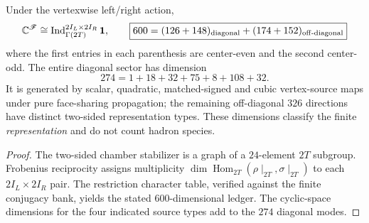 \documentclass[11pt]{article}
\begin{document}
\begin{theorem}
\label{p1:thm:v366-600-chamber-representation-ledger}
Under the vertexwise left/right action,
\[
 \mathbb C^{\mathscr F}\cong
 \operatorname{Ind}_{\Gamma(2T)}^{2I_L\times2I_R}{\bf1},
\qquad
 \boxed{600=(126+148)_{\rm diagonal}+(174+152)_{\rm off\text{-}diagonal}}
\]
where the first entries in each parenthesis are center-even and the
second center-odd.  The entire diagonal sector has dimension
\[
 \boxed{274=1+18+32+75+8+108+32}.
\]
It is generated by scalar, quadratic, matched-signed and cubic
vertex-source maps under pure face-sharing propagation; the
remaining off-diagonal $326$ directions have distinct two-sided
representation types.  These dimensions classify the finite
\emph{representation} and do not count hadron species.
\end{theorem}
\begin{proof}
The two-sided chamber stabilizer is a graph of a $24$-element
$2T$ subgroup.  Frobenius reciprocity assigns multiplicity
$\dim\operatorname{Hom}_{2T}(\rho\!\mid_{2T},\sigma\!\mid_{2T})$
to each $2I_L\times2I_R$ pair.  The restriction character table,
verified against the finite conjugacy bank, yields the stated
$600$-dimensional ledger.  The cyclic-space dimensions for the
four indicated source types add to the $274$ diagonal modes.
\end{proof}
\end{document}
